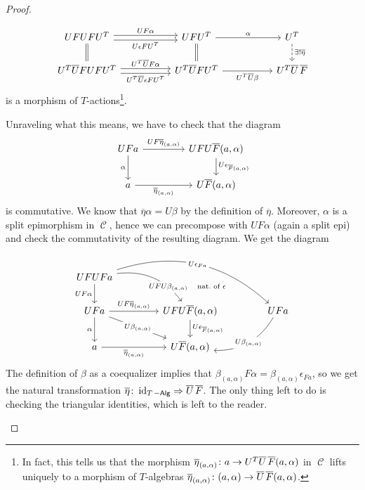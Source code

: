 \documentclass[a4paper,11pt,oneside,openany]{scrbook}
\DeclareMathOperator{\Alg}{-\mathsf{Alg}}
\DeclareMathOperator{\C}{\mathcal{C}}
\DeclareMathOperator{\id}{id}
\theoremstyle{definition}
\theoremstyle{definition}
\begin{document}
\begin{proof}
\begin{enumerate}
	\[
	\begin{tikzcd}[column sep=1.8cm]
	UFUFU^T\arrow[r, shift left, "UF\alpha"] \arrow[r, shift right, "U\epsilon FU^T"']\arrow[d, equal]	& UFU^T\arrow[r, "\alpha"] \arrow[d, equal] & U^T \arrow[d, dashed, "\exists!\overline{\eta}"]\\
	U^T\overline{U}FUFU^T\arrow[r, shift left,  "U^T\overline{U}F\alpha"] \arrow[r, shift right, "U^T\overline{U}\epsilon FU^T"']&U^T\overline{U}FU^T\arrow[r, "U^T\overline{U}\beta"']& U^T\overline{U}\hspace{.5mm}\overline{F}
	\end{tikzcd}
	\]
	is a morphism of $T$-actions\footnote{In fact, this tells us that the morphism $\overline{\eta}_{(a,\alpha)}\colon a\to U^T\overline{U}\hspace{.5mm}\overline{F}(a,\alpha)$ in $\C$ lifts uniquely to a morphism of $T$-algebras $\overline{\eta}_{(a,\alpha)}\colon(a,\alpha)\to\overline{U}\hspace{.5mm}\overline{F}(a,\alpha)$.}. 
	
	Unraveling what this means, we have to check that the diagram
	\[
	\begin{tikzcd}[column sep=1.5cm]
	UFa\ar[r, "UF\overline{\eta}_{(a,\alpha)}"]\ar[d,"\alpha"']
	& UFU\overline{F}(a,\alpha)\ar[d, "U\epsilon_{\overline{F}(a,\alpha)}"] \\
	a\ar[r, "\overline{\eta}_{(a,\alpha)}"']
	& U\overline{F}(a,\alpha)
	\end{tikzcd}
	\]	
	is commutative. We know that $\overline{\eta}\alpha=U\beta$ by the definition of $\overline{\eta}$. Moreover, $\alpha$ is a split epimorphism in $\C$, hence we can precompose with $UF\alpha$ (again a split epi) and check the commutativity of the resulting diagram. We get the diagram
	\[
	\begin{tikzcd}[column sep=1.5cm]
	UFUFa\arrow[d, "UF\alpha"'] \arrow[rd, bend left, near end, "UFU\beta_{(a,\alpha)}"description] \arrow[rrd, bend left, "U\epsilon_{Fa}"description] &            & \ar[lld,draw=none, near start,"\hspace{-1.5cm}\text{nat.\ of\ } \epsilon" description]  \\
	UFa\arrow[d, "\alpha"'] \arrow[r, "UF\overline{\eta}_{(a,\alpha)}"] \arrow[rd, "U\beta_{(a,\alpha)}"description]                        & UFU\overline{F}(a,\alpha)  \arrow[d, "U\epsilon_{\overline{F}(a,\alpha)}"] &        UFa           \arrow[ld, bend left, "U\beta_{(a,\alpha)}"description]      \\
	a\arrow[r, "\overline{\eta}_{(a,\alpha)}"']                                             &     U\overline{F}(a,\alpha)       &                        
	\end{tikzcd}
	\]
	The definition of $\beta$ as a coequalizer implies that $\beta_{(a,\alpha)}F\alpha=\beta_{(a,\alpha)}\epsilon_{Fa}$, so we get the natural transformation $\overline{\eta}\colon\id_{T\Alg}\Rightarrow\overline{U}\hspace{.5mm}\overline{F}$. The only thing left to do is checking the triangular identities, which is left to the reader.
	

\end{enumerate}
\end{proof}
\end{document}
